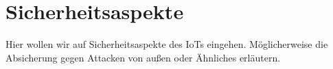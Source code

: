 \section{Sicherheitsaspekte}\label{s:Sicherheitsaspekte}

Hier wollen wir auf Sicherheitsaspekte des IoTs eingehen. Möglicherweise die Absicherung gegen Attacken von außen oder Ähnliches erläutern.